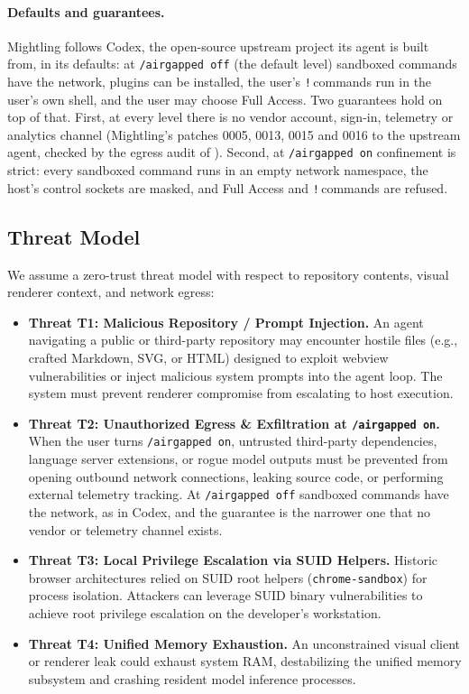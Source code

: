 \documentclass[11pt]{article}
\newcommand{\code}[1]{\texttt{#1}}
\newcommand{\agon}{\code{/airgapped on}}
\newcommand{\agoff}{\code{/airgapped off}}
\begin{document}
\paragraph{Defaults and guarantees.} Mightling follows Codex, the open-source upstream project its agent is built
from, in its defaults: at \agoff{} (the default level) sandboxed commands have the network, plugins can be installed,
the user's \code{!}\,commands run in the user's own shell, and the user may choose Full Access. Two guarantees hold
on top of that. First, at every level there is no vendor account, sign-in, telemetry or analytics channel (Mightling's
patches 0005, 0013, 0015 and 0016 to the upstream agent, checked by the egress audit of ).
Second, at \agon{} confinement is strict: every sandboxed command runs in an empty network namespace, the host's
control sockets are masked, and Full Access and \code{!}\,commands are refused.

\subsection{Threat Model}
\label{sec:threat-model}

We assume a zero-trust threat model with respect to repository contents, visual renderer context, and network
egress:
\begin{itemize}
    \item \textbf{Threat T1: Malicious Repository / Prompt Injection.} An agent navigating a public or third-party
    repository may encounter hostile files (e.g., crafted Markdown, SVG, or HTML) designed to exploit webview
    vulnerabilities or inject malicious system prompts into the agent loop. The system must prevent renderer
    compromise from escalating to host execution.
    \item \textbf{Threat T2: Unauthorized Egress \& Exfiltration at \agon.} When the user turns \agon, untrusted
    third-party dependencies, language server extensions, or rogue model outputs must be prevented from opening
    outbound network connections, leaking source code, or performing external telemetry tracking. At \agoff{} sandboxed
    commands have the network, as in Codex, and the guarantee is the narrower one that no vendor or telemetry
    channel exists.
    \item \textbf{Threat T3: Local Privilege Escalation via SUID Helpers.} Historic browser architectures relied on SUID
    root helpers (\code{chrome-sandbox}) for process isolation. Attackers can leverage SUID binary vulnerabilities to
    achieve root privilege escalation on the developer's workstation.
    \item \textbf{Threat T4: Unified Memory Exhaustion.} An unconstrained visual client or renderer leak could exhaust
    system RAM, destabilizing the unified memory subsystem and crashing resident model inference processes.
\end{itemize}
\end{document}
